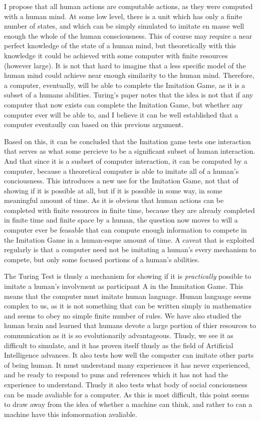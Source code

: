 \documentclass[11pt]{article}
\begin{document}
I propose that all human actions are computable actions, as they were computed with a human mind. At some low level, there is a unit which has only a finite number of states, and which can be simply simulated to imitate en masse well enough the whole of the human consciousness. This of course may require a near perfect knowledge of the state of a human mind, but theoretically with this knowledge it could be achieved with some computer with finite resources (however large). It is not that hard to imagine that a less specific model of the human mind could achieve near enough similarity to the human mind. Therefore, a computer, eventually, will be able to complete the Imitation Game, as it is a subset of a humans abilities. Turing's paper notes that the idea is not that if any computer that now exists can complete the Imitation Game, but whether any computer ever will be able to, and I believe it can be well established that a computer eventaully can based on this previous argument.

Based on this, it can be concluded that the Imitation game tests one interaction that serves as what some percieve to be a significant subset of human interaction. And that since it is a susbset of computer interaction, it can be computed by a computer, because a theoretical computer is able to imitate all of a human's conciousness. This introduces a new use for the Imitation Game, not that of showing if it is possible at all, but if it is possible in some way, in some meaningful amount of time. As it is obvious that human actions can be completed with finite resources in finite time, because they are already completed in finite time and finite space by a human, the question now moves to will a computer ever be feasable that can compute enough information to compete in the Imitation Game in a human-esque amount of time. A caveat that is exploited regularly is that a computer need not be imitating a human's every mechanism to compete, but only some focused portions of a human's abilities.

The Turing Test is thusly a mechanism for showing if it is {\it practically} possible to imitate a human's involvment as participant A in the Immitation Game. This means that the computer must imitate human language. Human language seems complex to us, as it is not something that can be written simply in mathematics and seems to obey no simple finite number of rules. We have also studied the human brain and learned that humans devote a large portion of thier resources to communication as it is so evolutionarily advantageous. Thusly, we see it as difficult to simulate, and it has proven itself thusly as the field of Artificial Intelligence advances. It also tests how well the computer can imitate other parts of being human. It must understand many experiences it has never experienced, and be ready to respond to puns and references which it has not had the experience to understand. Thusly it also tests what body of social conciousness can be made avaliable for a computer. As this is most difficult, this point seems to draw away from the idea of whether a machine can think, and rather to can a machine have this infomormation avaliable.
\end{document}
